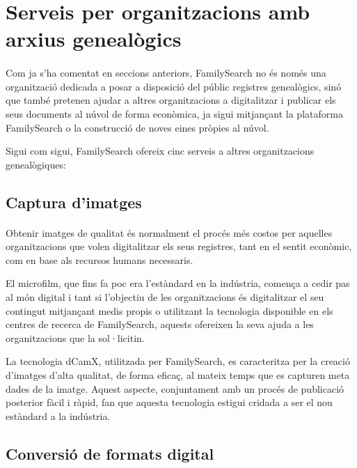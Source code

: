 \section{Serveis per organitzacions amb arxius genealògics}

    \paragraph{}
    Com ja s’ha comentat en seccions anteriors, FamilySearch no és només una organització dedicada a posar a disposició del públic registres genealògics, sinó que també pretenen ajudar a altres organitzacions a digitalitzar i publicar els seus documents al núvol de forma econòmica, ja sigui mitjançant la plataforma FamilySearch o la construcció de noves eines pròpies al núvol.

    Sigui com sigui, FamilySearch ofereix cinc serveis a altres organitzacions genealògiques:


    \subsection{Captura d'imatges}

    \paragraph{}
    Obtenir imatges de qualitat és normalment el procés més costos per aquelles organitzacions que volen digitalitzar els seus registres, tant en el sentit econòmic, com en base als recursos humans necessaris.

    El microfilm, que fins fa poc era l’estàndard en la indústria, comença a cedir pas al món digital i tant si l’objectiu de les organitzacions és digitalitzar el seu contingut mitjançant medis propis o utilitzant la tecnologia disponible en els centres de recerca de FamilySearch, aquests ofereixen la seva ajuda a les organitzacions que la sol·licitin.

    La tecnologia dCamX, utilitzada per FamilySearch, es caracteritza per la creació d'imatges d’alta qualitat, de forma eficaç, al mateix temps que es capturen meta dades de la imatge. Aquest aspecte, conjuntament amb un procés de publicació posterior fàcil i ràpid, fan que aquesta tecnologia estigui cridada a ser el nou estàndard a la indústria.


    \subsection{Conversió de formats digital}

